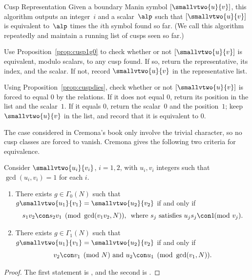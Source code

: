 \begin{algorithm}{Cusp Representation}\label{alg:cusplist}
  Given a boundary Manin symbol
  $[\smallvtwo{u}{v}]$, this algorithm outputs an integer~$i$ and a
  scalar~$\alp$ such that $[\smallvtwo{u}{v}]$ is equivalent to~$\alp$
  times the $i$th symbol found so far.  (We call this algorithm
  repeatedly and maintain a running list of cusps seen so far.)
\begin{steps}
\item Use Proposition~\ref{prop:cusp1g0} to check
whether or not $[\smallvtwo{u}{v}]$ is equivalent, modulo scalars, to
any cusp found.  If so, return the representative, its
index, and the scalar.  If not, record $\smallvtwo{u}{v}$ in the
representative list.
\item Using Proposition~\ref{prop:cuspdies},
check whether or not $[\smallvtwo{u}{v}]$ is forced to equal $0$ by the
relations.  If it does not equal $0$, return its position in the list
and the scalar~$1$.  If it equals $0$, return the scalar~$0$ and the
position~$1$; keep $\smallvtwo{u}{v}$ in the list, and record that it
is equivalent to $0$.
\end{steps}
\end{algorithm}

The case considered in Cremona's book \cite{cremona:algs} only
involve the trivial character, so no cusp classes
are forced to vanish.  Cremona gives the following two
criteria for equivalence.
\begin{proposition}[Cremona]\label{prop:cusp1}
Consider $\smallvtwo{u_i}{v_i}$, $i=1,2$, with $u_i,v_i$ integers such
that $\gcd(u_i,v_i)=1$ for each $i$.
\begin{enumerate}
\item There exists $g\in\Gamma_0(N)$ such that 
    $g\smallvtwo{u_1}{v_1}=\smallvtwo{u_2}{v_2}$ if and only if
 $$s_1 v_2 \con s_2 v_1 \pmod{\gcd(v_1 v_2,N)},\,
\text{ where $s_j$ satisfies $u_j s_j\con 1\!\!\!\pmod{v_j}$}.$$
\item There exists $g\in\Gamma_1(N)$ such that 
    $g\smallvtwo{u_1}{v_1}=\smallvtwo{u_2}{v_2}$ if and only if
 $$v_2 \con v_1 \pmod{N}\text{ and } u_2 \con u_1 \pmod{\gcd(v_1,N)}.$$
\end{enumerate}
\end{proposition}
\begin{proof}
The first statement is \cite[Prop.~2.2.3]{cremona:algs}, and
the second is \cite[Lem.~3.2]{cremona:gammaone}.
\end{proof}

